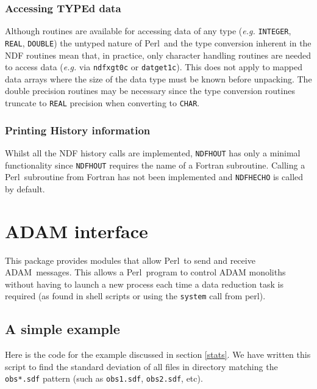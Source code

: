 \documentclass[twoside,11pt]{article}
\newcommand{\ADAM}{\xref{{ADAM}}{sun144}{}}
\newcommand{\perl}{\xref{\textsf{Perl}}{sun193}{}}
\newcommand{\xref}[3]{#1}
\renewcommand{\_}{\texttt{\symbol{95}}}
\begin{document}
\subsubsection{Accessing TYPEd data}%

Although routines are available for accessing data of any type
(\emph{e.g.} \texttt{\_INTEGER}, \texttt{\_REAL}, \texttt{\_DOUBLE})
the untyped nature of \perl\ and the type conversion inherent in the NDF
routines mean that, in practice, only character handling routines are
needed to access data (\emph{e.g.} via \texttt{ndf\_xgt0c} or
\texttt{dat\_get1c}).  This does not apply to mapped data arrays where
the size of the data type must be known before unpacking.  The double
precision routines may be necessary since the type conversion routines
truncate to \texttt{\_REAL} precision when converting to \texttt{\_CHAR}.

\subsubsection{Printing History information}%

Whilst all the NDF history calls are implemented, \texttt{NDF\_HOUT} has
only a minimal functionality since \texttt{NDF\_HOUT} requires the name of a
Fortran subroutine.  Calling a \perl\ subroutine from Fortran has not been
implemented and \texttt{NDF\_HECHO} is called by default.



\section{ADAM interface\label{adam}}

This package provides modules that allow \perl\ to send and receive \ADAM\
messages. This allows a \perl\ program to control ADAM monoliths without having
to launch a new process each time a data reduction task is required (as found
in \xref{shell scripts}{sc4}{} or using the \texttt{system} call from perl).


\subsection{A simple example}

Here is the code for the example discussed in section \ref{stats}. We have
written this script to find the standard deviation of all files in directory
matching the \texttt{obs*.sdf} pattern (such as \texttt{obs1.sdf},
\texttt{obs2.sdf}, etc).
\end{document}
